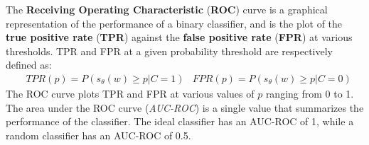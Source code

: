 The \textbf{Receiving Operating Characteristic} (\textbf{ROC}) curve is a graphical representation of the performance of a binary classifier, and is the plot of the \textbf{true positive rate} (\textbf{TPR}) against the \textbf{false positive rate} (\textbf{FPR}) at various thresholds. TPR and FPR at a given probability threshold are respectively defined as:
\begin{align*}
    &\textit{TPR}(p) = P(s_{\theta}(w) \geq p | C=1) &\textit{FPR}(p) = P(s_{\theta}(w) \geq p | C=0)
\end{align*}
The ROC curve plots TPR and FPR at various values of $p$ ranging from 0 to 1. The area under the ROC curve (\textit{AUC-ROC}) is a single value that summarizes the performance of the classifier. The ideal classifier has an AUC-ROC of 1, while a random classifier has an AUC-ROC of 0.5.
